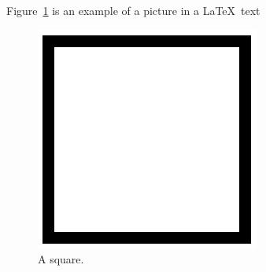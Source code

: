 \documentclass{article}
\begin{document}
Figure~\ref{fig:square} is an example of a picture in a \LaTeX\ text

\begin{figure}[hbt]
\begin{center}
\includegraphics{ch2ex2.eps}
\caption{A square.}
\label{fig:square}
\end{center}
\end{figure}
\end{document}
